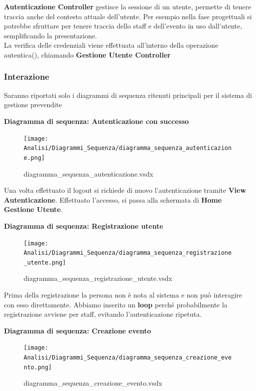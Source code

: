 \documentclass[a4paper]{article}
\begin{document}
\textbf{Autenticazione Controller} gestisce la sessione di un utente, permette di tenere traccia anche del contesto attuale dell'utente. Per esempio nella fase progettuali si potrebbe sfruttare per tenere traccia dello staff e dell'evento in uso dall'utente, semplificando la presentazione.\\ La verifica delle credenziali viene effettuata all'interno della operazione autentica(), chiamando \textbf{Gestione Utente Controller}

\newpage

\subsubsection{Interazione}

Saranno riportati solo i diagrammi di sequenza ritenuti principali per il sistema di gestione prevendite

\textbf{Diagramma di sequenza: Autenticazione con successo}

\begin{figure}[H]
    \texttt{[image: Analisi/Diagrammi\_Sequenza/diagramma\_sequenza\_autenticazione.png]}
    \centering
    \caption{diagramma\_sequenza\_autenticazione.vsdx}
\end{figure}

Una volta effettuato il logout si richiede di nuovo l'autenticazione tramite \textbf{View Autenticazione}. Effettuato l'accesso, si passa alla schermata di \textbf{Home Gestione Utente}.

\textbf{Diagramma di sequenza: Registrazione utente}

\begin{figure}[H]
    \texttt{[image: Analisi/Diagrammi\_Sequenza/diagramma\_sequenza\_registrazione\_utente.png]}
    \centering
    \caption{diagramma\_sequenza\_registrazione\_utente.vsdx}
\end{figure}

Prima della registrazione la persona non è nota al sistema e non può interagire con esso direttamente. Abbiamo inserito un \textbf{loop} perché probabilmente la registrazione avviene per staff, evitando l'autenticazione ripetuta.

\newpage

\textbf{Diagramma di sequenza: Creazione evento}

\begin{figure}[H]
    \texttt{[image: Analisi/Diagrammi\_Sequenza/diagramma\_sequenza\_creazione\_evento.png]}
    \centering
    \caption{diagramma\_sequenza\_creazione\_evento.vsdx}
\end{figure}
\end{document}
